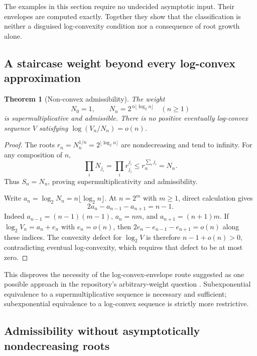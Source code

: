 \documentclass[11pt,a4paper]{article}
\numberwithin{equation}{section}
\newtheorem{theorem}{Theorem}[section]
\theoremstyle{definition}
\theoremstyle{remark}
\begin{document}
The examples in this section require no undecided asymptotic input. Their
envelopes are computed exactly. Together they show that the classification
is neither a disguised log-convexity condition nor a consequence of root
growth alone.

\subsection{A staircase weight beyond every log-convex approximation}

\begin{theorem}[Non-convex admissibility]
\label{thm:staircase}
The weight
\begin{equation}
 N_0=1,\qquad N_n=2^{\,n\lfloor\log_2n\rfloor}\quad(n\ge1)
 \label{eq:staircase}
\end{equation}
is supermultiplicative and admissible. There is no positive eventually
log-convex sequence $V$ satisfying $\log(V_n/N_n)=o(n)$.
\end{theorem}
\begin{proof}
The roots $r_n=N_n^{1/n}=2^{\lfloor\log_2n\rfloor}$ are
nondecreasing and tend to infinity. For any composition of $n$,
\[
 \prod_iN_{j_i}=\prod_i r_{j_i}^{j_i}
                  \le r_n^{\sum_i j_i}=N_n.
\]
Thus $S_n=N_n$, proving supermultiplicativity and admissibility.

Write $a_n=\log_2N_n=n\lfloor\log_2n\rfloor$. At $n=2^m$ with
$m\ge1$, direct calculation gives
\begin{equation}
 2a_n-a_{n-1}-a_{n+1}=n-1.
 \label{eq:staircasedefect}
\end{equation}
Indeed $a_{n-1}=(n-1)(m-1)$, $a_n=nm$, and
$a_{n+1}=(n+1)m$. If $\log_2V_n=a_n+e_n$ with $e_n=o(n)$,
then $2e_n-e_{n-1}-e_{n+1}=o(n)$ along these indices. The convexity
defect for $\log_2V$ is therefore $n-1+o(n)>0$, contradicting eventual
log-convexity, which requires that defect to be at most zero.
\end{proof}

This disproves the necessity of the log-convex-envelope route suggested
as one possible approach in the repository's arbitrary-weight question
\cite{repo-weight}. Subexponential equivalence to a supermultiplicative
sequence is necessary and sufficient; subexponential equivalence to a
log-convex sequence is strictly more restrictive.

\subsection{Admissibility without asymptotically nondecreasing roots}
\end{document}
